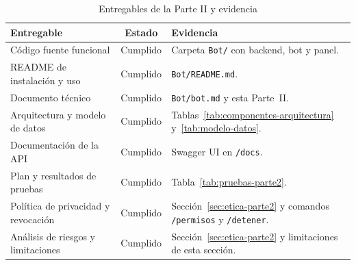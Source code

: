 \begin{table}[H]
	\caption{Entregables de la Parte II y evidencia}
	\label{tab:entregables-parte2}
	\centering
	\footnotesize
	\setlength{\tabcolsep}{4pt}
	\renewcommand{\arraystretch}{1.2}
	\begin{tabularx}{\textwidth}{@{}>{\raggedright\arraybackslash}p{} c Y@{}}
		\toprule
		\textbf{Entregable} & \textbf{Estado} & \textbf{Evidencia} \\
		\midrule
		Código fuente funcional & Cumplido & Carpeta \texttt{Bot/} con backend, bot y panel. \\
		README de instalación y uso & Cumplido & \texttt{Bot/README.md}. \\
		Documento técnico & Cumplido & \texttt{Bot/bot.md} y esta Parte~II. \\
		Arquitectura y modelo de datos & Cumplido & Tablas~\ref{tab:componentes-arquitectura} y~\ref{tab:modelo-datos}. \\
		Documentación de la API & Cumplido & Swagger UI en \texttt{/docs}. \\
		Plan y resultados de pruebas & Cumplido & Tabla~\ref{tab:pruebas-parte2}. \\
		Política de privacidad y revocación & Cumplido & Sección~\ref{sec:etica-parte2} y comandos \texttt{/permisos} y \texttt{/detener}. \\
		Análisis de riesgos y limitaciones & Cumplido & Sección~\ref{sec:etica-parte2} y limitaciones de esta sección. \\
		\bottomrule
	\end{tabularx}
\end{table}

